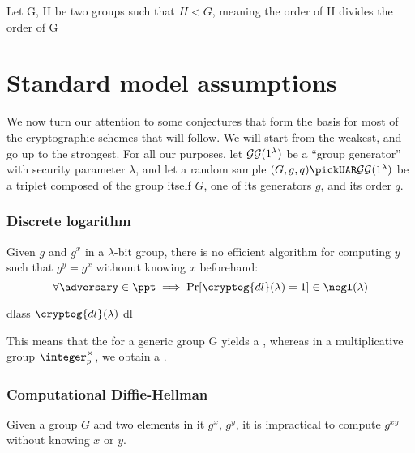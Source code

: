 \begin{theorem}
    Let G, H be two groups such that $H < G$, meaning the order of H divides the order of G
\end{theorem}

\section{Standard model assumptions}

We now turn our attention to some conjectures that form the basis for most of the cryptographic schemes that will follow. We will start from the weakest, and go up to the strongest. For all our purposes, let $\mathcal{GG}(1^\lambda)$ be a ``group generator'' with security parameter $\lambda$, and let a random sample $(G, g, q) \pickUAR \groupgen(1^\lambda)$ be a triplet composed of the group itself $G$, one of its generators $g$, and its order $q$.

\subsubsection{Discrete logarithm}

Given $g$ and $g^x$ in a $\lambda$-bit group, there is no efficient algorithm for computing $y$ such that $g^y = g^x$ withouut knowing $x$ beforehand:
\[
    \forall \adversary \in \ppt \implies \Pr[\cryptog{dl}(\lambda) = 1] \in \negl(\lambda)
\]

\begin{cryptogame}
    {dlass}
    {$\cryptog{dl}(\lambda)$}
    {dl}


    
\end{cryptogame}

This means that the \dl{} for a generic group G yields a \owf, whereas in a multiplicative group $\integer_p^\times$, we obtain a \owp.

\subsubsection{Computational Diffie-Hellman}

Given a group $G$ and two elements in it $g^x$, $g^y$, it is impractical to compute $g^{xy}$ without knowing $x$ or $y$.


